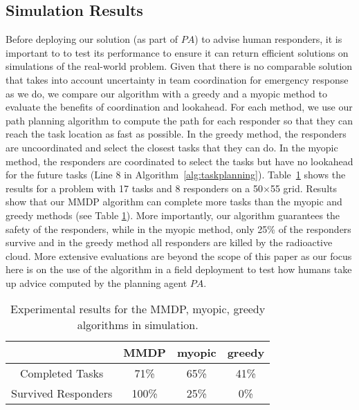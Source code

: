 \subsection{Simulation Results}



\noindent Before deploying our solution (as part of $PA$) to advise
human responders, it is important to to test its performance to
ensure it can return efficient solutions on simulations of the
real-world problem. Given that there is no comparable solution that
takes into account uncertainty in team coordination for emergency
response as we do, we compare our algorithm with a greedy and a
myopic method to evaluate the benefits of coordination and
lookahead. For each method, we use our path planning algorithm to
compute the path for each responder so that they can reach the task
location as fast as possible. In the greedy method, the responders
are uncoordinated and select the closest tasks that they can do. In
the myopic method, the responders are coordinated to select the
tasks but have no lookahead for the future tasks (Line 8 in
Algorithm~\ref{alg:taskplanning}). Table~\ref{tab:simulation} shows
the results for a problem with 17 tasks and 8 responders on a
50$\times$55 grid. Results show that our MMDP algorithm can
complete more tasks than the myopic and greedy methods (see Table
\ref{tab:simulation}). More importantly, our algorithm guarantees
the safety of the responders, while in the myopic method, only 25\%
of the responders survive and in the greedy method all responders
are killed by the radioactive cloud. More extensive evaluations are
beyond the scope of this paper as our focus here is on the use of
the algorithm in a field deployment to test how humans take up
advice computed by the planning agent $PA$.
\begin{table}[htbp]
  \centering
  \caption{Experimental results for the MMDP, myopic, greedy
  algorithms in simulation.}
  \begin{tabular}{c|c|c|c}
   & MMDP & myopic & greedy \\
  \hline
  Completed Tasks & 71\% & 65\% & 41\% \\
  \hline
  Survived Responders & 100\% & 25\% & 0\% \\
  \end{tabular}
  \label{tab:simulation}\vspace{-3mm}
\end{table}

